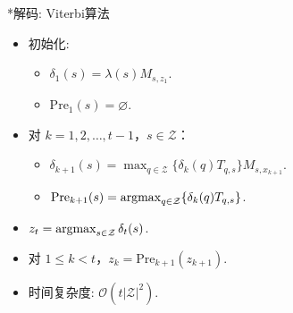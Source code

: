 \newcommand{\pre}{\mathrm{Pre}}
{*解码: Viterbi算法}
\begin{itemize}
    \item 初始化:
    \begin{itemize}
        \item $\delta_1(s) = \lambda(s)M_{s,z_1}$.
        \item $\pre_1(s) = \varnothing$.
    \end{itemize}
    \item 对 $k=1, 2, \dots, t-1$，$s \in \mathcal Z$：
    \begin{itemize}
        \item $\delta_{k+1}(s) = \max_{q\in \mathcal Z}\{\delta_k(q)T_{q,s}\}M_{s,x_{k+1}}$.
        \item $\pre_{k+1}(s) = \argmax_{q\in \mathcal Z}\{\delta_k(q)T_{q,s}\}$.
    \end{itemize}
    \item $z_t = \operatorname*{argmax}_{s \in \mathcal Z}\delta_{t}(s)$.
    \item 对 $1 \le k < t$，$z_k = \pre_{k+1}(z_{k+1})$.
    \item 时间复杂度: $\mathcal O(t|\mathcal Z|^2)$.
\end{itemize}

\endgroup
